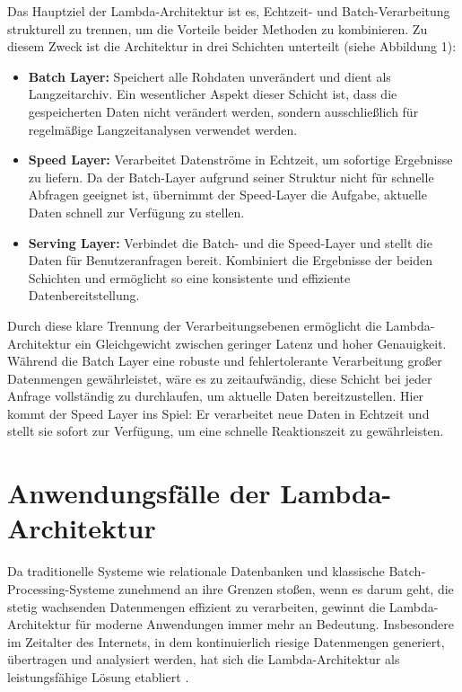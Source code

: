 Das Hauptziel der Lambda-Architektur ist es, Echtzeit- und Batch-Verarbeitung strukturell zu trennen, um die Vorteile beider Methoden zu kombinieren. Zu diesem Zweck ist die Architektur in drei Schichten unterteilt (siehe Abbildung 1):

\begin{itemize}
	\item \textbf{Batch Layer:} Speichert alle Rohdaten unverändert und dient als Langzeitarchiv. Ein wesentlicher Aspekt dieser Schicht ist, dass die gespeicherten Daten nicht verändert werden, sondern ausschließlich für regelmäßige Langzeitanalysen verwendet werden.
	\item \textbf{Speed Layer:} Verarbeitet Datenströme in Echtzeit, um sofortige Ergebnisse zu liefern. Da der Batch-Layer aufgrund seiner Struktur nicht für schnelle Abfragen geeignet ist, übernimmt der Speed-Layer die Aufgabe, aktuelle Daten schnell zur Verfügung zu stellen.
	\item \textbf{Serving Layer:} Verbindet die Batch- und die Speed-Layer und stellt die Daten für Benutzeranfragen bereit. Kombiniert die Ergebnisse der beiden Schichten und ermöglicht so eine konsistente und effiziente Datenbereitstellung.
\end{itemize}

Durch diese klare Trennung der Verarbeitungsebenen ermöglicht die Lambda-Architektur ein Gleichgewicht zwischen geringer Latenz und hoher Genauigkeit. Während die Batch Layer eine robuste und fehlertolerante Verarbeitung großer Datenmengen gewährleistet, wäre es zu zeitaufwändig, diese Schicht bei jeder Anfrage vollständig zu durchlaufen, um aktuelle Daten bereitzustellen. Hier kommt der Speed Layer ins Spiel: Er verarbeitet neue Daten in Echtzeit und stellt sie sofort zur Verfügung, um eine schnelle Reaktionszeit zu gewährleisten.

\section{Anwendungsfälle der Lambda-Architektur}
Da traditionelle Systeme wie relationale Datenbanken und klassische Batch-Processing-Systeme zunehmend an ihre Grenzen stoßen, wenn es darum geht, die stetig wachsenden Datenmengen effizient zu verarbeiten, gewinnt die Lambda-Architektur für moderne Anwendungen immer mehr an Bedeutung. Insbesondere im Zeitalter des Internets, in dem kontinuierlich riesige Datenmengen generiert, übertragen und analysiert werden, hat sich die Lambda-Architektur als leistungsfähige Lösung etabliert \cite{kumar2020lambda,kiran2015lambda,katkar2015study}.

